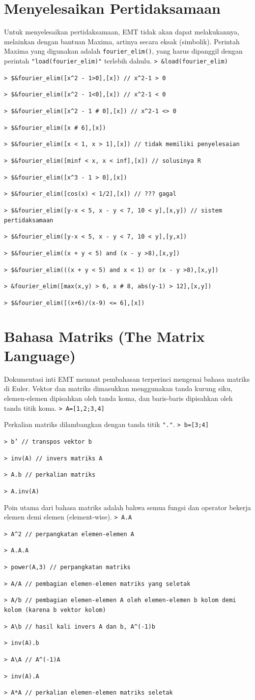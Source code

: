 \documentclass[11pt, a4paper]{article}
\newcommand{\emtcmd}[1]{\noindent\texttt{\textcolor{emtcommand}{>}\ #1}\par\smallskip}
\begin{document}
\section*{Menyelesaikan Pertidaksamaan}

Untuk menyelesaikan pertidaksamaan, EMT tidak akan dapat melakukannya, melainkan dengan bantuan Maxima, artinya secara eksak (simbolik). Perintah Maxima yang digunakan adalah \texttt{fourier\_elim()}, yang harus dipanggil dengan perintah \texttt{"load(fourier\_elim)"} terlebih dahulu.
\emtcmd{\&load(fourier\_elim)}
\emtcmd{\$\&fourier\_elim([x\^{}2 - 1>0],[x]) \textcolor{emtcomment}{// x\^{}2-1 > 0}}
\emtcmd{\$\&fourier\_elim([x\^{}2 - 1<0],[x]) \textcolor{emtcomment}{// x\^{}2-1 < 0}}
\emtcmd{\$\&fourier\_elim([x\^{}2 - 1 \# 0],[x]) \textcolor{emtcomment}{// x\^{}2-1 <> 0}}
\emtcmd{\$\&fourier\_elim([x \# 6],[x])}
\emtcmd{\$\&fourier\_elim([x < 1, x > 1],[x]) \textcolor{emtcomment}{// tidak memiliki penyelesaian}}
\emtcmd{\$\&fourier\_elim([minf < x, x < inf],[x]) \textcolor{emtcomment}{// solusinya R}}
\emtcmd{\$\&fourier\_elim([x\^{}3 - 1 > 0],[x])}
\emtcmd{\$\&fourier\_elim([cos(x) < 1/2],[x]) \textcolor{emtcomment}{// ??? gagal}}
\emtcmd{\$\&fourier\_elim([y-x < 5, x - y < 7, 10 < y],[x,y]) \textcolor{emtcomment}{// sistem pertidaksamaan}}
\emtcmd{\$\&fourier\_elim([y-x < 5, x - y < 7, 10 < y],[y,x])}
\emtcmd{\$\&fourier\_elim((x + y < 5) and (x - y >8),[x,y])}
\emtcmd{\$\&fourier\_elim(((x + y < 5) and x < 1) or (x - y >8),[x,y])}
\emtcmd{\&fourier\_elim([max(x,y) > 6, x \# 8, abs(y-1) > 12],[x,y])}
\emtcmd{\$\&fourier\_elim([(x+6)/(x-9) <= 6],[x])}

\section*{Bahasa Matriks (The Matrix Language)}

Dokumentasi inti EMT memuat pembahasan terperinci mengenai bahasa matriks di Euler. Vektor dan matriks dimasukkan menggunakan tanda kurung siku, elemen-elemen dipisahkan oleh tanda koma, dan baris-baris dipisahkan oleh tanda titik koma.
\emtcmd{A=[1,2;3,4]}

Perkalian matriks dilambangkan dengan tanda titik \texttt{"."}.
\emtcmd{b=[3;4]}
\emtcmd{b' \textcolor{emtcomment}{// transpos vektor b}}
\emtcmd{inv(A) \textcolor{emtcomment}{// invers matriks A}}
\emtcmd{A.b \textcolor{emtcomment}{// perkalian matriks}}
\emtcmd{A.inv(A)}

Poin utama dari bahasa matriks adalah bahwa semua fungsi dan operator bekerja elemen demi elemen (element-wise).
\emtcmd{A.A}
\emtcmd{A\^{}2 \textcolor{emtcomment}{// perpangkatan elemen-elemen A}}
\emtcmd{A.A.A}
\emtcmd{power(A,3) \textcolor{emtcomment}{// perpangkatan matriks}}
\emtcmd{A/A \textcolor{emtcomment}{// pembagian elemen-elemen matriks yang seletak}}
\emtcmd{A/b \textcolor{emtcomment}{// pembagian elemen-elemen A oleh elemen-elemen b kolom demi kolom (karena b vektor kolom)}}
\emtcmd{A\textbackslash b \textcolor{emtcomment}{// hasil kali invers A dan b, A\^{}(-1)b}}
\emtcmd{inv(A).b}
\emtcmd{A\textbackslash A \textcolor{emtcomment}{// A\^{}(-1)A}}
\emtcmd{inv(A).A}
\emtcmd{A*A \textcolor{emtcomment}{// perkalian elemen-elemen matriks seletak}}
\end{document}

